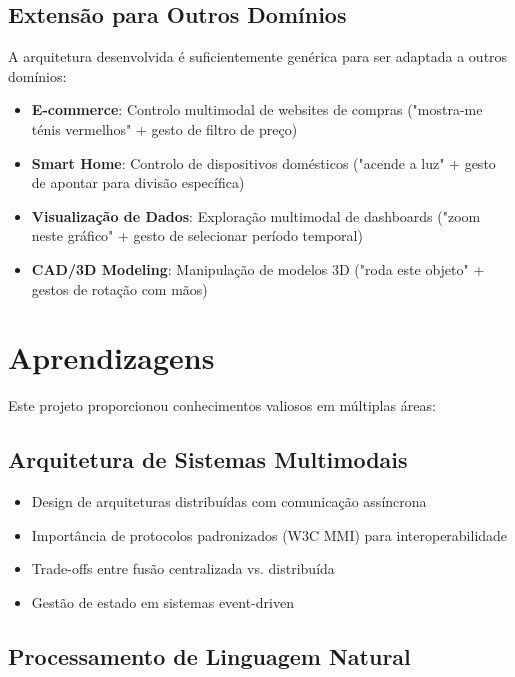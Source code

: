\subsection{Extensão para Outros Domínios}

A arquitetura desenvolvida é suficientemente genérica para ser adaptada a outros domínios:

\begin{itemize}
    \item \textbf{E-commerce}: Controlo multimodal de websites de compras ("mostra-me ténis vermelhos" + gesto de filtro de preço)

    \item \textbf{Smart Home}: Controlo de dispositivos domésticos ("acende a luz" + gesto de apontar para divisão específica)

    \item \textbf{Visualização de Dados}: Exploração multimodal de dashboards ("zoom neste gráfico" + gesto de selecionar período temporal)

    \item \textbf{CAD/3D Modeling}: Manipulação de modelos 3D ("roda este objeto" + gestos de rotação com mãos)
\end{itemize}

\section{Aprendizagens}

Este projeto proporcionou conhecimentos valiosos em múltiplas áreas:

\subsection{Arquitetura de Sistemas Multimodais}

\begin{itemize}
    \item Design de arquiteturas distribuídas com comunicação assíncrona
    \item Importância de protocolos padronizados (W3C MMI) para interoperabilidade
    \item Trade-offs entre fusão centralizada vs. distribuída
    \item Gestão de estado em sistemas event-driven
\end{itemize}

\subsection{Processamento de Linguagem Natural}

